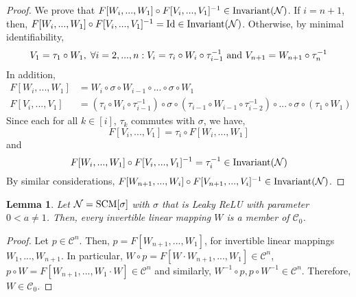 \documentclass{article} %
\newtheorem{lem}{Lemma}
\newcommand{\Id}{\textnormal{Id}}
\newcommand{\Inv}{\textnormal{Invariant}}
\begin{document}
\begin{proof}  We prove that $F[W_{i},...,W_1] \circ F[V_{i},...,V_1]^{-1} \in \Inv(\mathcal{N})$. If $i=n+1$, then, $F[W_{i},...,W_1] \circ F[V_{i},...,V_1]^{-1} = \Id \in \Inv(\mathcal{N})$. 
Otherwise, by minimal identifiability,
\begin{equation}
\begin{aligned}
&V_1 = \tau_1 \circ W_1, \; \forall i=2,...,n: V_i = \tau_i \circ W_i \circ \tau^{-1}_{i-1} \textnormal{ and } V_{n+1} =  W_{n+1} \circ  \tau^{-1}_{n} \\
\end{aligned}
\end{equation}
In addition, 
\begin{equation}
\begin{aligned}
F[W_{i},...,W_1] &= W_{i} \circ \sigma \circ W_{i-1} \circ ... \circ \sigma \circ W_1\\
F[V_{i},...,V_1] &= (\tau_{i} \circ W_{i} \circ \tau^{-1}_{i-1})\circ \sigma \circ (\tau_{i-1} \circ W_{i-1} \circ \tau^{-1}_{i-2}) \circ ... \circ\sigma \circ (\tau_1 \circ W_1) 
\end{aligned}
\end{equation}
Since each for all $k \in [i]$, $\tau_{k}$ commutes with $\sigma$, we have, 
\begin{equation}
F[V_{i},...,V_1] = \tau_{i} \circ F[W_{i},...,W_1]
\end{equation}
and 
\begin{equation}
F[W_{i},...,W_1] \circ F[V_{i},...,V_1]^{-1} = \tau^{-1}_i \in \Inv(\mathcal{N})
\end{equation} 
By similar considerations, $F[W_{n+1},...,W_i] \circ F[V_{n+1},...,V_i]^{-1} \in \Inv(\mathcal{N})$.
\end{proof}

 
\begin{lem}\label{lem:linearC0}  Let $\mathcal{N} = \textnormal{SCM}[\sigma]$ with $\sigma$ that is Leaky ReLU with parameter $0<a\neq 1$. Then, every invertible linear mapping $W$ is a member of $\mathcal{C}_0$.
\end{lem}

 
\begin{proof} Let $p\in \mathcal{C}^n$. Then, $p = F[W_{n+1},...,W_1]$, for invertible linear mappings $W_{1},...,W_{n+1}$. In particular, $W \circ p = F[W\cdot W_{n+1},...,W_1] \in \mathcal{C}^n$, $p \circ W = F[W_{n+1},...,W_1\cdot W] \in \mathcal{C}^n$ and similarly, $W^{-1} \circ p, p \circ W^{-1} \in \mathcal{C}^n$. Therefore, $W \in \mathcal{C}_0$.
\end{proof}
\end{document}
